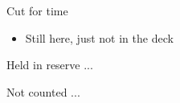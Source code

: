 
\begin{hidden}
\begin{frame}{Cut for time}
  \begin{itemize}
    \item Still here, just not in the deck
  \end{itemize}
\end{frame}
\end{hidden}






\backupframes

\begin{frame}{Held in reserve}
  ...
\end{frame}

\begin{frame}[noframenumbering]{Not counted}
  ...
\end{frame}
